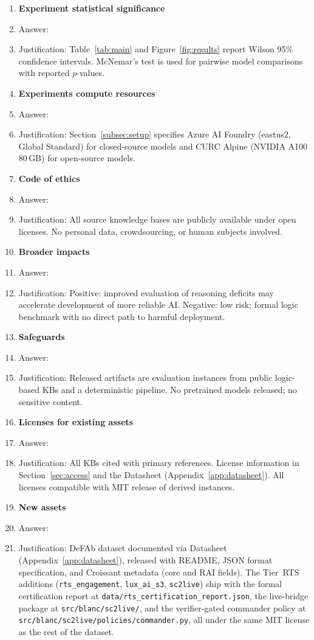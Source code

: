 \documentclass{article}
\theoremstyle{definition}
\begin{document}
\begin{enumerate}
\item {\bf Experiment statistical significance}
    \item[] Answer: \answerYes{}
    \item[] Justification: Table~\ref{tab:main} and Figure~\ref{fig:results} report Wilson 95\% confidence intervals. McNemar's test is used for pairwise model comparisons with reported $p$-values.

\item {\bf Experiments compute resources}
    \item[] Answer: \answerYes{}
    \item[] Justification: Section~\ref{subsec:setup} specifies Azure AI Foundry (eastus2, Global Standard) for closed-source models and CURC Alpine (NVIDIA A100 80\,GB) for open-source models.

\item {\bf Code of ethics}
    \item[] Answer: \answerYes{}
    \item[] Justification: All source knowledge bases are publicly available under open licenses. No personal data, crowdsourcing, or human subjects involved.

\item {\bf Broader impacts}
    \item[] Answer: \answerYes{}
    \item[] Justification: Positive: improved evaluation of reasoning deficits may accelerate development of more reliable AI. Negative: low risk; formal logic benchmark with no direct path to harmful deployment.

\item {\bf Safeguards}
    \item[] Answer: \answerNA{}
    \item[] Justification: Released artifacts are evaluation instances from public logic-based KBs and a deterministic pipeline. No pretrained models released; no sensitive content.

\item {\bf Licenses for existing assets}
    \item[] Answer: \answerYes{}
    \item[] Justification: All KBs cited with primary references. License information in Section~\ref{sec:access} and the Datasheet (Appendix~\ref{app:datasheet}). All licenses compatible with MIT release of derived instances.

\item {\bf New assets}
    \item[] Answer: \answerYes{}
    \item[] Justification: DeFAb dataset documented via Datasheet (Appendix~\ref{app:datasheet}), released with README, JSON format specification, and Croissant metadata (core and RAI fields). The Tier~RTS additions (\texttt{rts\_engagement}, \texttt{lux\_ai\_s3}, \texttt{sc2live}) ship with the formal certification report at \texttt{data/rts\_certification\_report.json}, the live-bridge package at \texttt{src/blanc/sc2live/}, and the verifier-gated commander policy at \texttt{src/blanc/sc2live/policies/commander.py}, all under the same MIT license as the rest of the dataset.


\end{enumerate}
\end{document}
